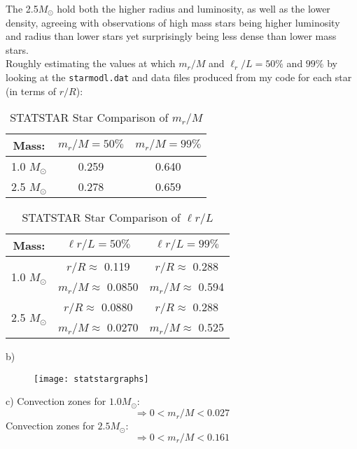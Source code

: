 \documentclass[14pt]{extarticle}
\begin{document}
The 2.5$M_{\odot}$ hold both the higher radius and luminosity, as well as the lower density, agreeing with observations of high mass stars being higher luminosity and radius than lower stars yet surprisingly being less dense than lower mass stars. \\

Roughly estimating the values at which $m_r/M$ and $\ell_r/L = 50\%$  and $99\%$ by looking at the \texttt{starmodl.dat} and data files produced from my code for each star (in terms of $r/R$):

\begin{table}[H]
	\caption{STATSTAR Star Comparison of $m_r/M$}
	\centering
	\begin{tabular} {|c|c|c|}
		\hline
		Mass: & $m_r/M = 50\%$ & $m_r/M = 99\%$  \\
		\hline 
		1.0 $M_\odot$ & 0.259 & 0.640  \\ 
		2.5 $M_\odot$ & 0.278 & 0.659 \\
		\hline
	\end{tabular}
\end{table}
\begin{table}[H]
	\caption{STATSTAR Star Comparison of $\ell{r}/L$} 
	\centering
	\begin{tabular} {|c|c|c|}
		\hline
		Mass: & $\ell{r}/L = 50\%$ & $\ell{r}/L = 99\%$  \\
		\hline 
		\multirow{2}{*}{1.0 $M_\odot$} & $r/R \approx$ 0.119  & $r/R \approx$ 0.288 \\ 
		& $m_r/M\approx$ 0.0850 & $m_r/M \approx$ 0.594 \\
		\hline
		\multirow{2}{*}{2.5 $M_\odot$} & $r/R \approx$ 0.0880 & $r/R \approx$ 0.288 \\
		& $m_r/M\approx$ 0.0270 &  $m_r/M \approx$ 0.525 \\
		\hline
	\end{tabular}
\end{table}

\pagebreak
\noindent b) 
\begin{figure}[H]
	\centerline{\texttt{[image: statstargraphs]}}
\end{figure}
\noindent c) Convection zones for $1.0M_\odot$: 
$$ \Rightarrow 0 < m_r/M < 0.027 $$
Convection zones for $2.5M_\odot$:
$$ \Rightarrow 0 < m_r/M < 0.161 $$

\pagebreak

	
\end{document}
